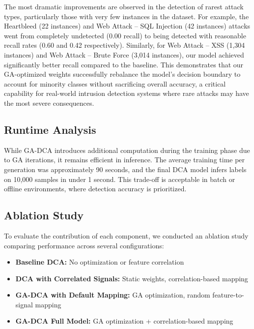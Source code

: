 \documentclass[conference]{IEEEtran}
\begin{document}
The most dramatic improvements are observed in the detection of rarest attack types,
particularly those with very few instances in the dataset. For example, the Heartbleed
(22 instances) and Web Attack – SQL Injection (42 instances) attacks went from completely
undetected (0.00 recall) to being detected with reasonable recall rates (0.60 and 0.42
respectively). Similarly, for Web Attack – XSS (1,304 instances) and Web Attack – Brute Force
(3,014 instances), our model achieved significantly better recall compared to the baseline.
This demonstrates that our GA-optimized weights successfully rebalance the model's decision
boundary to account for minority classes without sacrificing overall accuracy, a critical
capability for real-world intrusion detection systems where rare attacks may have the most
severe consequences.

\subsection{Runtime Analysis}

While GA-DCA introduces additional computation during the training
phase due to GA iterations, it remains efficient in inference. The
average training time per generation was approximately 90 seconds,
and the final DCA model infers labels on 10,000 samples in under 1
second. This trade-off is acceptable in batch or offline
environments, where detection accuracy is prioritized.

\subsection{Ablation Study}

To evaluate the contribution of each component, we conducted an
ablation study comparing performance across several configurations:

\begin{itemize}
  \item \textbf{Baseline DCA:} No optimization or feature correlation
  \item \textbf{DCA with Correlated Signals:} Static weights,
    correlation-based mapping
  \item \textbf{GA-DCA with Default Mapping:} GA optimization, random
    feature-to-signal mapping
  \item \textbf{GA-DCA Full Model:} GA optimization +
    correlation-based mapping
\end{itemize}
\end{document}
